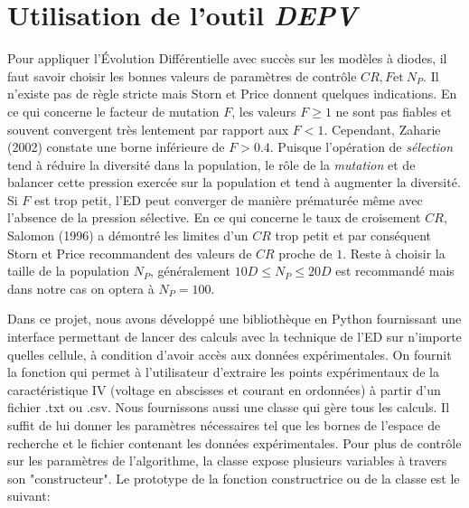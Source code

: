 \section{Utilisation de l'outil \textit{DEPV}}

Pour appliquer l'Évolution Différentielle avec succès sur les modèles à diodes, il faut savoir choisir les bonnes valeurs de paramètres de contrôle $CR, F \text{et}\  N_P$. Il n'existe pas de règle stricte mais Storn et Price \cite{Price2005} donnent quelques indications. En ce qui concerne le facteur de mutation $F$, les valeurs $F \geq 1$ ne sont pas fiables et souvent convergent très lentement par rapport aux $F < 1$. Cependant, Zaharie (2002) \cite{Zaharie2002} constate une borne inférieure de $F > 0.4$. Puisque l'opération de \textit{sélection} tend à réduire la diversité dans la population, le rôle de la \textit{mutation} et de balancer cette pression exercée sur la population et tend à augmenter la diversité. Si $F$ est trop petit, l'ED peut converger de manière prématurée même avec l'absence de la pression sélective. En ce qui concerne le taux de croisement $CR$, Salomon (1996) \cite{Salomon1996} a démontré les limites d'un $CR$ trop petit et par conséquent Storn et Price recommandent des valeurs de $CR$ proche de $1$. Reste à choisir la taille de la population $N_P$, généralement $10D \leq N_P \leq 20D$ est recommandé mais dans notre cas on optera à $N_P = 100$.

Dans ce projet, nous avons développé une bibliothèque en Python fournissant une interface permettant de lancer des calculs avec la technique de l'ED sur n'importe quelles cellule, à condition d'avoir accès aux données expérimentales. On fournit la fonction  qui permet à l'utilisateur d'extraire les points expérimentaux de la caractéristique IV (voltage en abscisses et courant en ordonnées) à partir d'un fichier .txt ou .csv. Nous fournissons aussi une classe  qui gère tous les calculs. Il suffit de lui donner les paramètres nécessaires tel que les bornes de l'espace de recherche et le fichier contenant les données expérimentales. Pour plus de contrôle sur les paramètres de l'algorithme, la classe  expose plusieurs variables à travers son "constructeur". Le prototype de la fonction constructrice ou  de la classe  est le suivant:

